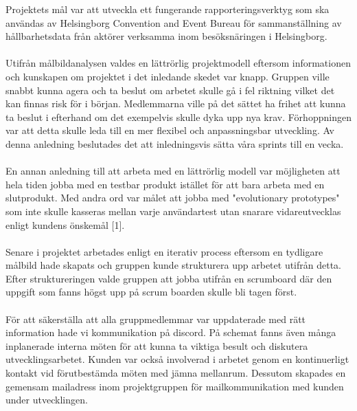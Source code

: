 \documentclass[12pt]{article}
\begin{document}
Projektets mål var att utveckla ett fungerande rapporteringsverktyg som ska användas av Helsingborg Convention and Event Bureau för sammanställning av \\ hållbarhetsdata från aktörer verksamma inom besöksnäringen i Helsingborg. \\\\
Utifrån målbildanalysen valdes en lättrörlig projektmodell eftersom informationen och kunskapen om projektet i det inledande skedet var knapp. Gruppen ville snabbt kunna agera och ta beslut om arbetet skulle gå i fel riktning vilket det kan finnas risk för i början. Medlemmarna ville på det sättet ha frihet att kunna ta beslut i efterhand om det exempelvis skulle dyka upp nya krav. Förhoppningen var att detta skulle leda till en mer flexibel och anpassningsbar utveckling. Av denna anledning beslutades det att inledningsvis sätta våra sprints till en vecka. \\\\ 
En annan anledning till att arbeta med en lättrörlig modell var möjligheten att hela tiden jobba med en testbar produkt istället för att bara arbeta med en slutprodukt. Med andra ord var målet att jobba med "evolutionary prototypes" som inte skulle kasseras mellan varje användartest utan snarare vidareutvecklas enligt kundens önskemål [1].\\\\
Senare i projektet arbetades enligt en iterativ process eftersom en tydligare målbild hade skapats och gruppen kunde strukturera upp arbetet utifrån detta. Efter struktureringen valde gruppen att jobba utifrån en scrumboard där den uppgift som fanns högst upp på scrum boarden skulle bli tagen först. \\\\
För att säkerställa att alla gruppmedlemmar var uppdaterade med rätt information hade vi kommunikation på discord. På schemat fanns även många inplanerade interna möten för att kunna ta viktiga besult och diskutera utvecklingsarbetet. Kunden var också involverad i arbetet genom en kontinuerligt kontakt vid förutbestämda möten med jämna mellanrum. Dessutom skapades en gemensam mailadress inom projektgruppen för mailkommunikation med kunden under utvecklingen.\\\\
\end{document}
